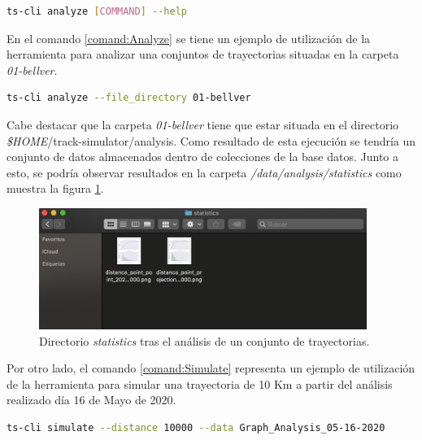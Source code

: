 \begin{lstlisting}[caption={Ejecución ayuda de comando}, language=bash, label={comand:Help}] 
	ts-cli analyze [COMMAND] --help
\end{lstlisting}

En el comando \ref{comand:Analyze} se tiene un ejemplo de utilización de la herramienta para analizar una conjuntos de trayectorias situadas en la carpeta \textit{01-bellver}.

\begin{lstlisting}[caption={Ejecución análisis}, language=bash, label={comand:Analyze}] 
	ts-cli analyze --file_directory 01-bellver
\end{lstlisting}

Cabe destacar que la carpeta \textit{01-bellver} tiene que estar situada en el directorio \textit{\$HOME}/track-simulator/analysis. Como resultado de esta ejecución se tendría un conjunto de datos almacenados dentro de colecciones de la base datos. Junto a esto, se podría observar resultados en la carpeta \textit{/data/analysis/statistics} como muestra la figura \ref{figure:StatisticsFolder}.

\begin{figure}[!htb]
\begin{center}
\includegraphics[width=0.95\textwidth]{./Imagenes/statisticsFolderResults.png}
\caption{Directorio \textit{statistics} tras el análisis de un conjunto de trayectorias.}
\label{figure:StatisticsFolder}
\end{center}
\end{figure}
\newpage

Por otro lado,  el comando \ref{comand:Simulate} representa un ejemplo de utilización de la herramienta para simular una trayectoria de 10 Km a partir del análisis realizado día 16 de Mayo de 2020.

\begin{lstlisting}[caption={Ejecución simulación}, language=bash, label={comand:Simulate}]  
	ts-cli simulate --distance 10000 --data Graph_Analysis_05-16-2020
\end{lstlisting}

